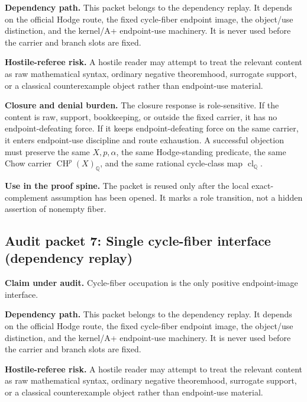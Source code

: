 \documentclass[11pt]{article}
\newcommand{\QQ}{\mathbb{Q}}
\newcommand{\CH}{\operatorname{CH}}
\newcommand{\clQ}{\operatorname{cl}_{\QQ}}
\begin{document}
\par\noindent\textbf{Dependency path.} This packet belongs to the dependency replay. It depends on the official Hodge route, the fixed cycle-fiber endpoint image, the object/use distinction, and the kernel/A+ endpoint-use machinery. It is never used before the carrier and branch slots are fixed.


\par\noindent\textbf{Hostile-referee risk.} A hostile reader may attempt to treat the relevant content as raw mathematical syntax, ordinary negative theoremhood, surrogate support, or a classical counterexample object rather than endpoint-use material.


\par\noindent\textbf{Closure and denial burden.} The closure response is role-sensitive. If the content is raw, support, bookkeeping, or outside the fixed carrier, it has no endpoint-defeating force. If it keeps endpoint-defeating force on the same carrier, it enters endpoint-use discipline and route exhaustion. A successful objection must preserve the same $X,p,\alpha$, the same Hodge-standing predicate, the same Chow carrier $\CH^p(X)_\QQ$, and the same rational cycle-class map $\clQ$.


\par\noindent\textbf{Use in the proof spine.} The packet is reused only after the local exact-complement assumption has been opened. It marks a role transition, not a hidden assertion of nonempty fiber.


\subsection{Audit packet 7: Single cycle-fiber interface (dependency replay)}


\par\noindent\textbf{Claim under audit.} Cycle-fiber occupation is the only positive endpoint-image interface.


\par\noindent\textbf{Dependency path.} This packet belongs to the dependency replay. It depends on the official Hodge route, the fixed cycle-fiber endpoint image, the object/use distinction, and the kernel/A+ endpoint-use machinery. It is never used before the carrier and branch slots are fixed.


\par\noindent\textbf{Hostile-referee risk.} A hostile reader may attempt to treat the relevant content as raw mathematical syntax, ordinary negative theoremhood, surrogate support, or a classical counterexample object rather than endpoint-use material.
\end{document}
